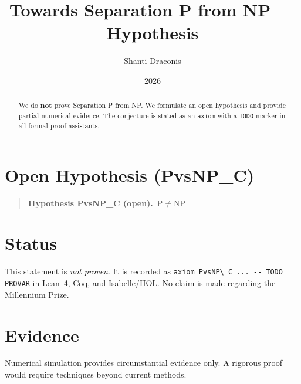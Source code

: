 \documentclass[11pt]{article}
\title{Towards Separation P from NP — Hypothesis}
\author{Shanti Draconis}
\date{2026}
\begin{document}
\maketitle

\begin{abstract}
We do \textbf{not} prove Separation P from NP.
We formulate an open hypothesis and provide partial numerical evidence.
The conjecture is stated as an \texttt{axiom} with a \texttt{TODO}
marker in all formal proof assistants.
\end{abstract}

\section{Open Hypothesis (PvsNP\_C)}
\begin{quote}
  \textbf{Hypothesis PvsNP\_C (open).}~$\mathrm{P} \neq \mathrm{NP}$
\end{quote}

\section{Status}
This statement is \emph{not proven}.  It is recorded as
\verb|axiom PvsNP\_C ... -- TODO PROVAR| in Lean~4, Coq, and Isabelle/HOL.
No claim is made regarding the Millennium Prize.

\section{Evidence}
Numerical simulation provides circumstantial evidence only.
A rigorous proof would require techniques beyond current methods.
\end{document}
